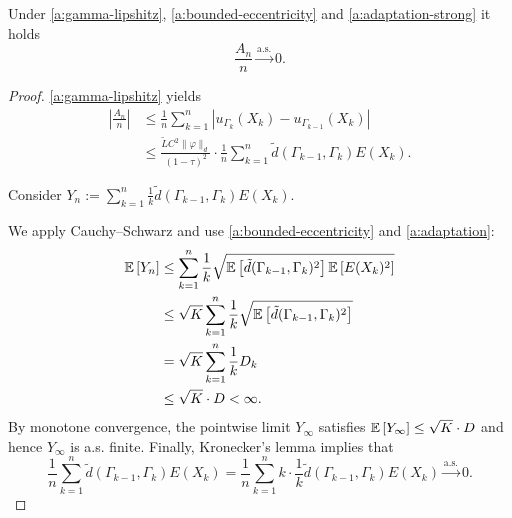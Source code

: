 \begin{lemma}
Under \ref{a:gamma-lipshitz}, \ref{a:bounded-eccentricity} and \ref{a:adaptation-strong} it holds
\[
    \frac{A_n}{n} \xrightarrow{\text{a.s.}} 0.
\]

\begin{proof}
    \ref{a:gamma-lipshitz} yields
    \begin{align*}
        \left\vert\frac{A_n}{n}\right\vert
        & \leq \frac{1}{n} \sum_{k=1}^n \left\vert u_{\Gamma_k}(X_k) - u_{\Gamma_{k-1}}(X_k) \right\vert \\
        &  \leq \frac{\tilde{L} C^2 \| \varphi \|_d}{(1-\tau)^2} \cdot \frac{1}{n} \sum_{k=1}^n \tilde{d}(\Gamma_{k-1}, \Gamma_k) E(X_k).
    \end{align*}

    Consider $Y_n := \sum_{k=1}^n \frac{1}{k} \tilde{d}(\Gamma_{k-1}, \Gamma_k) E(X_k) $.
    
    We apply Cauchy–Schwarz and use \ref{a:bounded-eccentricity} and \ref{a:adaptation}:
    \begin{align*}
        \mathbb{E} \left[ Y_n \right] 
        &\leq \sum_{k=1}^n  \frac{1}{k} \sqrt{\mathbb{E} \left[ \tilde{d}(\Gamma_{k-1}, \Gamma_k)^2 \right] \mathbb{E} \left[ E(X_k)^2 \right]} \\
        &\leq \sqrt{K} \sum_{k=1}^n \frac{1}{k}  \sqrt{\mathbb{E} \left[ \tilde{d}(\Gamma_{k-1}, \Gamma_k)^2 \right]} \\
        &= \sqrt{K} \sum_{k=1}^n \frac{1}{k} D_k\\
        &\leq \sqrt{K} \cdot D < \infty.
    \end{align*}
    By monotone convergence, the pointwise limit $Y_{\infty}$ satisfies $\mathbb{E} \left[ Y_{\infty} \right] \leq \sqrt{K} \cdot D$ and hence $Y_{\infty}$ is a.s. finite.
    Finally, Kronecker's lemma implies that
    \[
        \frac{1}{n} \sum_{k=1}^n \tilde{d}(\Gamma_{k-1}, \Gamma_k) E(X_k) = \frac{1}{n} \sum_{k=1}^n k \cdot \frac{1}{k} \tilde{d}(\Gamma_{k-1}, \Gamma_k) E(X_k) \xrightarrow{\text{a.s.}} 0. 
    \]

\end{proof}
\end{lemma}

